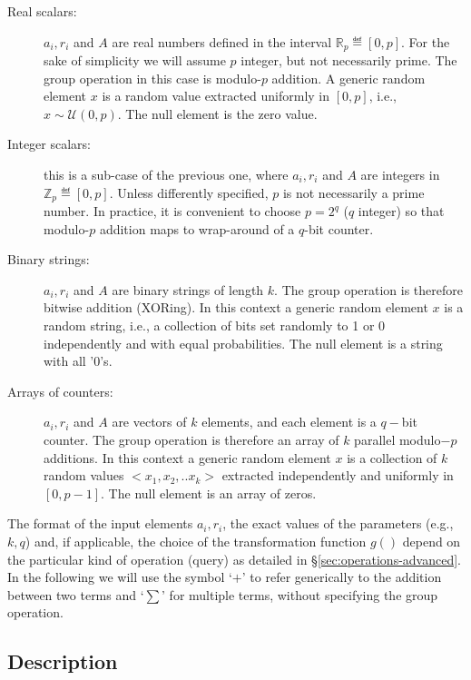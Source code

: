 \documentclass{sig-alternate}
\begin{document}
\begin{description}
	\item [Real scalars:]  
	$a_i, r_i$ and $A$ are real numbers defined in the interval $\mathbb{R}_p \eqdef [0,p]$. For the sake of simplicity we will assume $p$ integer, but not necessarily prime. 
The group operation in this case is modulo-$p$ addition.
A generic random element $x$ is a random value extracted uniformly in $[0,p]$, i.e., $x \sim \mathcal{U}(0,p)$. The null element is the zero value.
	\item[Integer scalars:] 
this is a sub-case of the previous one, where $a_i, r_i$ and $A$ are integers in $\mathbb{Z}_p \eqdef [0,p]$. Unless differently specified, $p$ is  not necessarily a prime number. In practice, it is convenient to choose $p=2^q$ ($q$ integer) so that modulo-$p$ addition maps to wrap-around of a $q$-bit counter. 
	\item[Binary strings:] $a_i, r_i$ and $A$ are binary strings of length $k$. The group operation is therefore bitwise addition (XORing).
In this context a generic random element  $x$ is a random string, i.e., a collection of bits set randomly to 1 or 0 independently and with equal probabilities. The null element is  a string with all '0's.
	\item[Arrays of counters:] $a_i, r_i$ and $A$ are vectors of $k$ elements, and each element is a  $q-$bit counter.
The group operation is therefore an array of  $k$  parallel modulo$-p$ additions.
In this context a generic random element  $x$ is a collection of $k$ random values $<x_1, x_2,..x_k>$ extracted independently and uniformly in $[0,p-1]$. 
The null element is an array of zeros. 

\end{description}

The format of the input elements $a_i, r_i$, the exact values of the parameters (e.g., $k,q$) and, if applicable, the choice of the transformation function $g()$ depend on the particular kind of operation (query) as detailed in \S\ref{sec:operations-advanced}. 
 In the following we will use the symbol  `$+$' to refer generically to the addition between two terms and  `$\sum$' for multiple terms, without specifying the group operation. 


\subsection{Description}\label{sec:ata}
\end{document}
